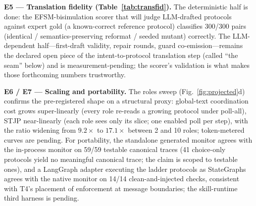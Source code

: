 \documentclass{article}
\newcommand{\stjp}{\textsc{STJP}}
\begin{document}
\textbf{E5 --- Translation fidelity (Table~\ref{tab:transfid}).} The deterministic half is done: the EFSM-bisimulation scorer that will judge LLM-drafted protocols against expert gold (a known-correct reference protocol) classifies 300/300 pairs (identical / semantics-preserving reformat / seeded mutant) correctly. The LLM-dependent half---first-draft validity, repair rounds, guard co-emission---remains the declared open piece of the intent-to-protocol translation step (called ``the seam'' below) and is measurement-pending; the scorer's validation is what makes those forthcoming numbers trustworthy.

\textbf{E6 / E7 --- Scaling and portability.} The roles sweep (Fig.~\ref{fig:projected}d) confirms the pre-registered shape on a structural proxy: global-text coordination cost grows super-linearly (every role re-reads a growing protocol under poll-all), \stjp{} near-linearly (each role sees only its slice; one enabled poll per step), with the ratio widening from $9.2\times$ to $17.1\times$ between 2 and 10 roles; token-metered curves are pending. For portability, the standalone generated monitor agrees with the in-process monitor on 59/59 testable canonical traces (41 choice-only protocols yield no meaningful canonical trace; the claim is scoped to testable ones), and a LangGraph adapter executing the ladder protocols as StateGraphs agrees with the native monitor on 14/14 clean-and-injected checks, consistent with T4's placement of enforcement at message boundaries; the skill-runtime third harness is pending.
\end{document}
